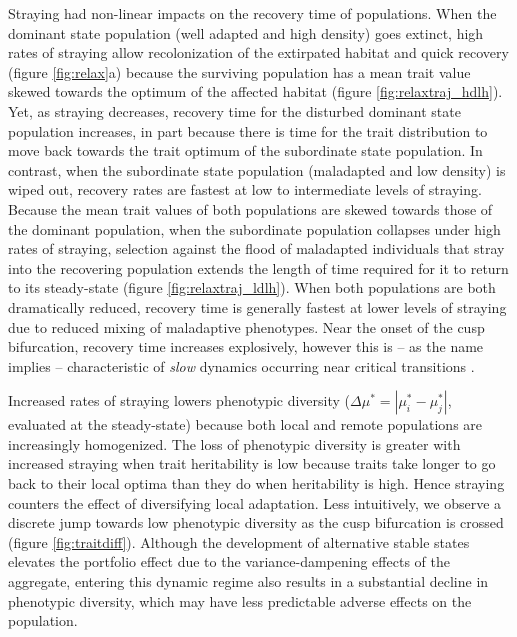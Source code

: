 \documentclass{revtex4}
\begin{document}
Straying had non-linear impacts on the recovery time of populations. 
When the dominant state population (well adapted and high density) goes extinct, high rates of straying allow recolonization of the extirpated habitat and quick recovery (figure \ref{fig:relax}a) because the surviving population has a mean trait value skewed towards the optimum of the affected habitat (figure \ref{fig:relaxtraj_hdlh}).
Yet, as straying decreases, recovery time for the disturbed dominant state population increases, in part because there is time for the trait distribution to move back towards the trait optimum of the subordinate state population.
In contrast, when the subordinate state population (maladapted and low density) is wiped out, recovery rates are fastest at low to intermediate levels of straying.
Because the mean trait values of both populations are skewed towards those of the dominant population, when the subordinate population collapses under high rates of straying, selection against the flood of maladapted individuals that stray into the recovering population extends the length of time required for it to return to its steady-state (figure \ref{fig:relaxtraj_ldlh}).
When both populations are both dramatically reduced, recovery time is generally fastest at lower levels of straying due to reduced mixing of maladaptive phenotypes.
Near the onset of the cusp bifurcation, recovery time increases explosively, however this is -- as the name implies -- characteristic of \emph{slow} dynamics occurring near critical transitions \citep{Scheffer:2009gg,Kuehn:2010p2591}.



Increased rates of straying lowers phenotypic diversity ($\Delta \mu^* = |\mu_i^*-\mu_j^*|$, evaluated at the steady-state) because both local and remote populations are increasingly homogenized.
The loss of phenotypic diversity is greater with increased straying when trait heritability is low because traits take longer to go back to their local optima than they do when heritability is high. 
Hence straying counters the effect of diversifying local adaptation. 
Less intuitively, we observe a discrete jump towards low phenotypic diversity as the cusp bifurcation is crossed (figure \ref{fig:traitdiff}).
Although the development of alternative stable states elevates the portfolio effect due to the variance-dampening effects of the aggregate, entering this dynamic regime also results in a substantial decline in phenotypic diversity, which may have less predictable adverse effects on the population.\\
\end{document}
